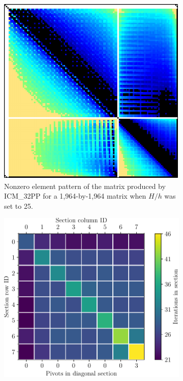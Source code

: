 \begin{figure}[ht!]
	\centering
	\begin{subfigure}[t]{0.45\textwidth}
		\centering
		\includegraphics[width=\textwidth]{images/ch03/input-matrices/bddcml-benchmark/poc-25_4_2-LU_ICM32PP.pdf}
		\caption{Nonzero element pattern of the  matrix produced by ICM\_32PP for a 1,964-by-1,964 matrix when $H/h$ was set to 25.}
		\label{Figure:comparing-decomposers-and-solvers->bddcml-benchmark->benchmark-results->speedup-comparison-of-decomposers-in-pc-setup-stage->speedup-comparison->ICM_32PP->25-4-2->LU}
	\end{subfigure}%
	\hspace{0.03\textwidth}
	\begin{subfigure}[t]{0.51\textwidth}
		\centering
		\includegraphics[width=\textwidth]{images/ch03/input-matrices/bddcml-benchmark/poc-25_4_2_icmxpp_metrics.pdf}

\end{subfigure}
\end{figure}
